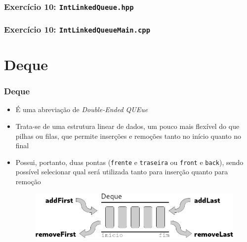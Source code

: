 \documentclass[aspectratio=169]{beamer}
\begin{document}
\begin{frame}[fragile]\frametitle{Exercício 10: \texttt{IntLinkedQueue.hpp}}

\end{frame}

\begin{frame}[fragile]\frametitle{Exercício 10: \texttt{IntLinkedQueueMain.cpp}}
\fontsize{6pt}{6pt}\selectfont{

}
\end{frame}

\section{Deque}

\begin{frame}\frametitle{Deque}
\begin{itemize}
	\item É uma abreviação de \emph{Double-Ended QUEue}
	\item Trata-se de uma estrutura linear de dados, um pouco mais flexível do que pilhas ou filas, que permite inserções e remoções tanto no início quanto no final
	\item Possui, portanto, duas pontas (\texttt{frente} e \texttt{traseira} ou \texttt{front} e \texttt{back}), sendo possível selecionar qual será utilizada tanto para inserção quanto para remoção
\begin{figure}[h]
	\centering
	\includegraphics[height=0.3\paperheight]{imagens/deque.png}
\end{figure}
\end{itemize}
\end{frame}
\end{document}
